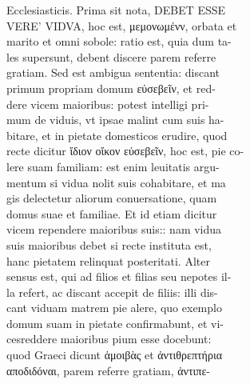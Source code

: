 \documentclass{article}
\begin{document}
\begin{pages}
                Ecclesiasticis. Prima sit nota, DEBET ESSE \\
                VERE' VIDVA, hoc est, μεμονωμένν, orbata et \\
                marito et omni sobole: ratio est, quia dum ta- \\
                les supersunt, debent discere parem referre \\
                gratiam. Sed est ambigua sententia: discant \\
                primum propriam domum εύσεβεῖν, et red- \\
                dere vicem maioribus: potest intelligi pri- \\
                mum de viduis, vt ipsae malint cum suis ha- \\
                bitare, et in pietate domesticos erudire, quod \\
                recte dicitur ἴδιον οἴκον εὐσεβεῖν, hoc est, pie co- \\
                lere suam familiam: est enim leuitatis argu- \\
                mentum si vidua nolit suis cohabitare, et ma \\
                gis delectetur aliorum conuersatione, quam \\
                domus suae et familiae. Et id etiam dicitur \\
                vicem rependere maioribus suis:: nam vidua \\
                suis maioribus debet si recte instituta est, \\
                hanc pietatem relinquat posteritati. Alter \\
                sensus est, qui ad filios et filias seu nepotes il- \\
                la refert, ac discant accepit de filiis: illi dis- \\
                cant viduam matrem pie alere, quo exemplo \\
                domum suam in pietate confirmabunt, et vi- \\
                cesreddere maioribus pium esse docebunt: \\
                quod Graeci dicunt ἁμοιβὰς et ἀντιθρεπτήρια \\
                αποδιδόναι, parem referre gratiam, ἀντιπε- \\

\end{pages}
\end{document}
